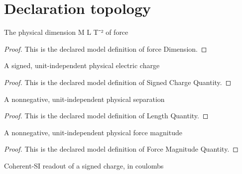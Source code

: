 \section{Declaration topology}
\begin{definition}
  \label{def:physics:phyx-mini-0992:phyxminiproblems-problemphyxmini0992-forcedimension}
  The physical dimension M L T⁻² of force
\end{definition}
\begin{proof}
  This is the declared model definition of force Dimension.
\end{proof}
\begin{definition}
  \label{def:physics:phyx-mini-0992:phyxminiproblems-problemphyxmini0992-signedchargequantity}
  A signed, unit-independent physical electric charge
\end{definition}
\begin{proof}
  This is the declared model definition of Signed Charge Quantity.
\end{proof}
\begin{definition}
  \label{def:physics:phyx-mini-0992:phyxminiproblems-problemphyxmini0992-lengthquantity}
  A nonnegative, unit-independent physical separation
\end{definition}
\begin{proof}
  This is the declared model definition of Length Quantity.
\end{proof}
\begin{definition}
  \label{def:physics:phyx-mini-0992:phyxminiproblems-problemphyxmini0992-forcemagnitudequantity}
  A nonnegative, unit-independent physical force magnitude
\end{definition}
\begin{proof}
  This is the declared model definition of Force Magnitude Quantity.
\end{proof}
\begin{definition}
  \label{def:physics:phyx-mini-0992:phyxminiproblems-problemphyxmini0992-chargeincoulombs}
  Coherent-SI readout of a signed charge, in coulombs
\end{definition}
